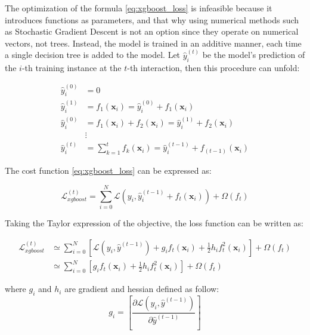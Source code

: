 The optimization of the formula \ref{eq:xgboost_loss} is infeasible because it introduces functions as parameters, and that why using numerical methods such as Stochastic Gradient Descent is not an option since they operate on numerical vectors, not trees.  Instead, the model is trained in an additive manner, each time a single decision tree is added to the model. Let $\hat{y}_{i}^{(t)}$ be the model's prediction of the $i$-th training instance at the $t$-th interaction, then this procedure can unfold:        

\begin{equation}
\begin{split}
    \hat{y}_{i}^{(0)} &= 0  \\
    \hat{y}_{i}^{(1)} &= f_{1}(\textbf{x}_i) = \hat{y}_{i}^{(0)} +  f_{1}(\textbf{x}_i)  \\
    \hat{y}_{i}^{(0)} &= f_{1}(\textbf{x}_i) + f_{2}(\textbf{x}_i) = \hat{y}_{i}^{(1)} +  f_{2}(\textbf{x}_i)   \\
    & \vdots   \\ 
    \hat{y}_{i}^{(t)} &=  \sum_{k=1}^{t}f_{k}(\textbf{x}_i) =  \hat{y}_{i}^{(t-1)} + f_{(t-1)}(\textbf{x}_i)
\end{split}
\end{equation}

The cost function \ref{eq:xgboost_loss} can be expressed as:

\begin{equation}
   \mathcal{L}_{xgboost}^{(t)} = \sum_{i=0}^{N}  \mathcal{L}(y_i,  \hat{y}_{i}^{(t-1)} + f_{t}(\mathbf{x}_i)) + \Omega(f_{t})
\end{equation}
 
Taking the Taylor expression of the objective, the loss function can be written as:

\begin{equation}
\begin{split}
   \mathcal{L}_{xgboost}^{(t)} &\simeq \sum_{i=0}^{N} \left[ 
   \mathcal{L}(y_i, \hat{y}^{(t-1)}) + g_i f_t(\mathbf{x}_i) + \frac{1}{2}h_if_{t}^{2}(\mathbf{x}_i)  
   \right] + \Omega(f_{t}) \\
    &\simeq \sum_{i=0}^{N} \left[ 
 g_i f_t(\mathbf{x}_i) + \frac{1}{2}h_if_{t}^{2}(\mathbf{x}_i)  
   \right] + \Omega(f_{t})
   \end{split}
   \label{eq:xgboost_taylor}
\end{equation}

where $g_i$ and $h_i$ are gradient and hessian defined as follow:  
\begin{equation}
    g_i = \left[\frac{\partial \mathcal{L}(y_{i},\hat{y}^{(t-1)})}{\partial \hat{y}^{(t-1)}} \right]
\end{equation}

